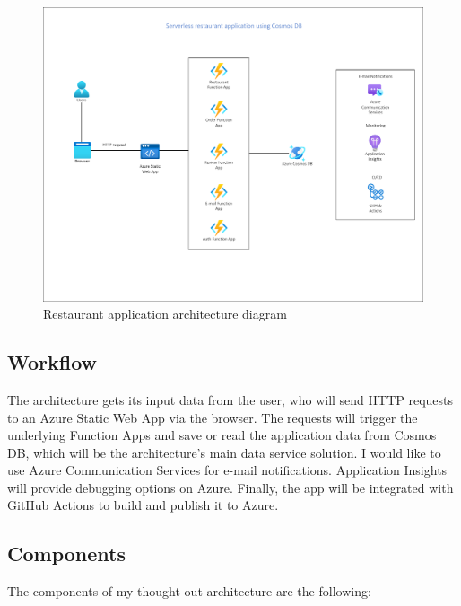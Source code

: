 \begin{figure}[!ht]
	\centering
	\includegraphics[width=150mm, keepaspectratio]{figures/AppArch}
	\caption{Restaurant application architecture diagram} 
	\label{fig:AppArch}
\end{figure}

\subsection{Workflow}

The architecture gets its input data from the user, who will send HTTP requests to an Azure Static Web App via the browser. The requests will trigger the underlying Function Apps and save or read the application data from Cosmos DB, which will be the architecture's main data service solution. I would like to use Azure Communication Services for e-mail notifications. Application Insights will provide debugging options on Azure. Finally, the app will be integrated with GitHub Actions to build and publish it to Azure.

\subsection{Components}

The components of my thought-out architecture are the following:


